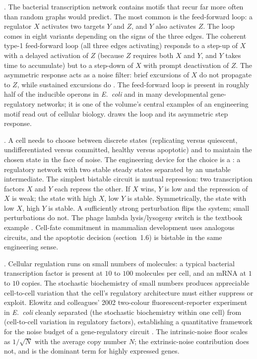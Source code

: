 . The bacterial transcription network
contains motifs that recur far more often than random graphs would
predict. The most common is the feed-forward loop: a regulator $X$
activates two targets $Y$ and $Z$, and $Y$ also activates $Z$. The
loop comes in eight variants depending on the signs of the three
edges. The coherent type-1 feed-forward loop (all three edges
activating) responds to a step-up of $X$ with a delayed activation of
$Z$ (because $Z$ requires both $X$ and $Y$, and $Y$ takes time to
accumulate) but to a step-down of $X$ with prompt deactivation of
$Z$. The asymmetric response acts as a noise filter: brief excursions
of $X$ do not propagate to $Z$, while sustained excursions do
\cite[ch.~4]{text:alon-systems-biology,paper:v6c01-shoval-alon-2010}.
The feed-forward loop is present in roughly half of the inducible
operons in \emph{E.~coli} and in many developmental gene-regulatory
networks; it is one of the volume's central examples of an
engineering motif read out of cellular biology.
 draws the loop and its
asymmetric step response.



. A cell needs to choose between
discrete states (replicating versus quiescent, undifferentiated versus
committed, healthy versus apoptotic) and to maintain the chosen state
in the face of noise. The engineering device for the choice is a
: a regulatory network with two stable
steady states separated by an unstable intermediate. The simplest
bistable circuit is mutual repression: two transcription factors $X$
and $Y$ each repress the other. If $X$ wins, $Y$ is low and the
repression of $X$ is weak; the state with high $X$, low $Y$ is stable.
Symmetrically, the state with low $X$, high $Y$ is stable. A
sufficiently strong perturbation flips the system; small perturbations
do not. The phage lambda lysis/lysogeny switch is the textbook example
\cite[ch.~5]{text:alon-systems-biology}. Cell-fate commitment in
mammalian development uses analogous circuits, and the apoptotic
decision (section~1.6) is bistable in the same engineering sense.

. Cellular regulation runs on small numbers
of molecules: a typical bacterial transcription factor is present at
$10$ to $100$ molecules per cell, and an mRNA at $1$ to $10$ copies.
The stochastic biochemistry of small numbers produces appreciable
cell-to-cell variation that the cell's regulatory architecture must
either suppress or exploit. Elowitz and colleagues' 2002 two-colour
fluorescent-reporter experiment in \emph{E.~coli} cleanly separated
 (the stochastic biochemistry within one
cell) from  (cell-to-cell variation in
regulatory factors), establishing a quantitative framework for the
noise budget of a gene-regulatory circuit
\cite{paper:v6c01-elowitz-2002}. The intrinsic-noise floor scales
as $1/\sqrt{N}$ with the average copy number $N$; the extrinsic-noise
contribution does not, and is the dominant term for highly expressed
genes.

